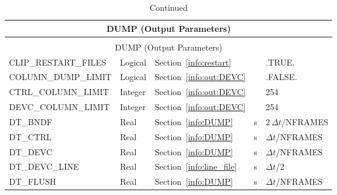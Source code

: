 \documentclass[11pt]{book}
\begin{document}
\begin{longtable}{@{\extracolsep{\fill}}|l|l|l|l|l|}
\caption[Output control parameters ({\ct DUMP} namelist group)]{For more information see Section~\ref{info:DUMP}.}
\label{tbl:DUMP} \\
\hline
\multicolumn{5}{|c|}{{\ct DUMP} (Output Parameters)} \\
\hline \hline
\endfirsthead
\caption[]{Continued} \\
\hline
\multicolumn{5}{|c|}{{\ct DUMP} (Output Parameters)} \\
\hline \hline
\endhead
{\ct CLIP\_RESTART\_FILES}          & Logical      & Section~\ref{info:restart}             &           & {\ct .TRUE.}                   \\ \hline
{\ct COLUMN\_DUMP\_LIMIT}           & Logical      & Section~\ref{info:out:DEVC}            &           & {\ct .FALSE.}                  \\ \hline
{\ct CTRL\_COLUMN\_LIMIT}           & Integer      & Section~\ref{info:out:DEVC}            &           & 254                            \\ \hline
{\ct DEVC\_COLUMN\_LIMIT}           & Integer      & Section~\ref{info:out:DEVC}            &           & 254                            \\ \hline
{\ct DT\_BNDF}                      & Real         & Section~\ref{info:DUMP}                &  s        & $2\,\Delta t${\ct /NFRAMES}    \\ \hline
{\ct DT\_CTRL}                      & Real         & Section~\ref{info:DUMP}                &  s        & $\Delta t${\ct /NFRAMES}       \\ \hline
{\ct DT\_DEVC}                      & Real         & Section~\ref{info:DUMP}                &  s        & $\Delta t${\ct /NFRAMES}       \\ \hline
{\ct DT\_DEVC\_LINE}                & Real         & Section~\ref{info:line_file}           &  s        & $\Delta t${\ct /2}             \\ \hline
{\ct DT\_FLUSH}                     & Real         & Section~\ref{info:DUMP}                &  s        & $\Delta t${\ct /NFRAMES}       \\ \hline

\end{longtable}
\end{document}

